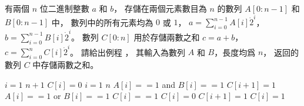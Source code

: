 \startEXERCISE
有兩個 $n$ 位二進制整數 $a$ 和 $b$，
存儲在兩個元素數目為 $n$ 的數列 $A[0:n-1]$ 和 $B[0:n-1]$ 中，
數列中的所有元素均為 $0$ 或 $1$，
$a = \sum_{i=0}^{n-1}A[i]\dot 2^i$，
$b = \sum_{i=0}^{n-1}B[i]\dot 2^i$。
數列 $C[0:n]$ 用於存儲兩數之和 $c=a+b$，
$c = \sum_{i=0}^{n}C[i]\dot 2^i$。
請給出例程 ，
其輸入為數列 $A$ 和 $B$，長度均爲 $n$，
返回的數列 $C$ 中存儲兩數之和。
\stopEXERCISE
\startANSWER

\startCLRSCODE
\For $i = 1$ \To $n + 1$
	$C[i] = 0$
\For $i = 1$ \To $n$
	\If $A[i] == 1$ and $B[i] == 1$
		$C[i+1] = 1$
	\Else \If $A[i] == 1$ or $B[i] == 1$
		\If $C[i] == 1$
			$C[i] = 0$
			$C[i+1] = 1$
		\Else
			$C[i] = 1$
\stopCLRSCODE

\stopANSWER

\stopsection
